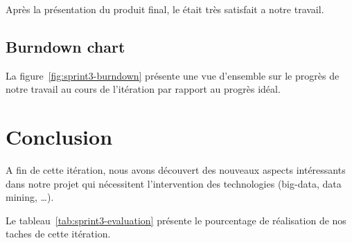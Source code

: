 Après la présentation du produit final, le  était très satisfait
a notre travail.

\subsection{Burndown chart}

La figure~\ref{fig:sprint3-burndown} présente une vue d'ensemble sur le progrès
de notre travail au cours de l'itération par rapport au progrès idéal.



\section*{Conclusion}

A fin de cette itération, nous avons découvert des nouveaux aspects intéressants dans notre projet
qui nécessitent l'intervention des technologies (big-data, data mining, \ldots).

Le tableau~\ref{tab:sprint3-evaluation} présente le pourcentage de
réalisation de nos taches de cette itération.


